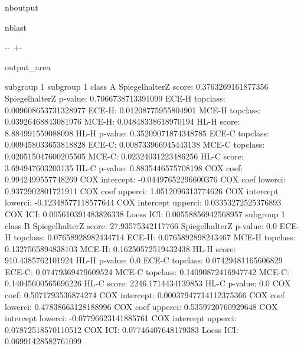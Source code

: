 \documentclass[letterpaper,10pt,english]{sphinxmanual}
\begin{document}
\begin{sphinxuseclass}{nboutput}
\begin{sphinxuseclass}{nblast}
{

\kern-\sphinxverbatimsmallskipamount\kern-\baselineskip
\kern+\FrameHeightAdjust\kern-\fboxrule
\vspace{\nbsphinxcodecellspacing}

\begin{sphinxuseclass}{output_area}
\begin{sphinxuseclass}{}


\begin{sphinxVerbatim}[commandchars=\\\{\}]
subgroup 1
subgroup 1 class A
SpiegelhalterZ score: 0.3763269161877356
SpiegelhalterZ p-value: 0.7066738713391099
ECE-H topclass: 0.009608653731328977
ECE-H: 0.01208775955804901
MCE-H topclass: 0.03926468843081976
MCE-H: 0.04848338618970194
HL-H score: 8.884991559088098
HL-H p-value: 0.35209071874348785
ECE-C topclass: 0.009458033653818828
ECE-C: 0.008733966945443138
MCE-C topclass: 0.020515047600205505
MCE-C: 0.02324031223486256
HL-C score: 3.694947603203135
HL-C p-value: 0.8835446575708198
COX coef: 0.9942499557748269
COX intercept: -0.04497652296600376
COX coef lowerci: 0.9372902801721911
COX coef upperci: 1.0512096313774626
COX intercept lowerci: -0.12348577118577644
COX intercept upperci: 0.03353272525376893
COX ICI: 0.005610391483826338
Loess ICI: 0.00558856942568957
subgroup 1 class B
SpiegelhalterZ score: 27.93575342117766
SpiegelhalterZ p-value: 0.0
ECE-H topclass: 0.07658928982434714
ECE-H: 0.0765892898243467
MCE-H topclass: 0.1327565894838103
MCE-H: 0.16250572519432438
HL-H score: 910.4385762101924
HL-H p-value: 0.0
ECE-C topclass: 0.07429481165606829
ECE-C: 0.07479369479609524
MCE-C topclass: 0.14090872416947742
MCE-C: 0.14045600565696226
HL-C score: 2246.1714434139853
HL-C p-value: 0.0
COX coef: 0.5071793536874274
COX intercept: 0.00037947714112375366
COX coef lowerci: 0.47838663128188996
COX coef upperci: 0.5359720760929648
COX intercept lowerci: -0.07796623141885761
COX intercept upperci: 0.07872518570110512
COX ICI: 0.07746407648179383
Loess ICI: 0.06991428582761099
\end{sphinxVerbatim}



\end{sphinxuseclass}
\end{sphinxuseclass}
}

\end{sphinxuseclass}
\end{sphinxuseclass}
\end{document}
